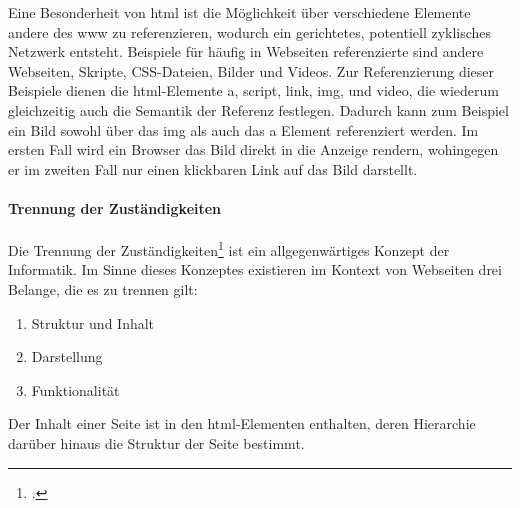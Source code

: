             Eine Besonderheit von \gls{html} ist die Möglichkeit
            über verschiedene Elemente andere {\resources} des \gls{www} zu referenzieren,
            wodurch ein gerichtetes, potentiell zyklisches Netzwerk entsteht.
            Beispiele für häufig in Webseiten referenzierte {\resources}
            sind andere Webseiten, Skripte, CSS-Dateien, Bilder und Videos.
            Zur Referenzierung dieser Beispiele dienen die \gls{html}-Elemente
            a, script, link, img, und video,
            die wiederum gleichzeitig auch die Semantik der Referenz festlegen.
            Dadurch kann zum Beispiel ein Bild sowohl über das img
            als auch das a Element referenziert werden.
            Im ersten Fall wird ein Browser das Bild direkt in die Anzeige rendern,
            wohingegen er im zweiten Fall nur einen klickbaren Link auf das Bild darstellt.

            \paragraph*{Trennung der Zuständigkeiten}
            Die Trennung der Zuständigkeiten\footcite[vgl.][]{huersch:SeparationOfConcerns}
            ist ein allgegenwärtiges Konzept der Informatik.
            Im Sinne dieses Konzeptes existieren im Kontext von Webseiten
            drei Belange, die es zu trennen gilt:

            \begin{enumerate}
                \item Struktur und Inhalt
                \item Darstellung
                \item Funktionalität
            \end{enumerate}

            Der Inhalt einer Seite ist in den \gls{html}-Elementen enthalten,
            deren Hierarchie darüber hinaus die Struktur der Seite bestimmt.
            
